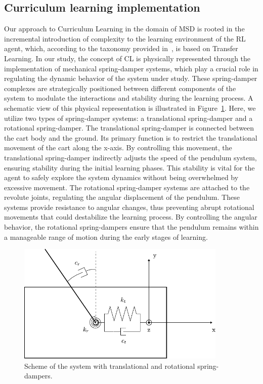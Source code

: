 \subsection{Curriculum learning implementation} \label{subsec: Curriculum learning implementation}
Our approach to Curriculum Learning in the domain of MSD is rooted in the incremental introduction of complexity to the learning environment of the RL agent, which, according to the taxonomy provided in~\cite{narvekar2020survey}, is based on Transfer Learning.
In our study, the concept of CL is physically represented through the implementation of mechanical spring-damper systems, which play a crucial role in regulating the dynamic behavior of the system under study. These spring-damper complexes are strategically positioned between different components of the system to modulate the interactions and stability during the learning process. A schematic view of this physical representation is illustrated in Figure~\ref{fig: cl mechanical implementation}. Here, we utilize two types of spring-damper systems: a translational spring-damper and a rotational spring-damper. The translational spring-damper is connected between the cart body and the ground. Its primary function is to restrict the translational movement of the cart along the x-axis. By controlling this movement, the translational spring-damper indirectly adjusts the speed of the pendulum system, ensuring stability during the initial learning phases. This stability is vital for the agent to safely explore the system dynamics without being overwhelmed by excessive movement. The rotational spring-damper systems are attached to the revolute joints, regulating the angular displacement of the pendulum. These systems provide resistance to angular changes, thus preventing abrupt rotational movements that could destabilize the learning process. By controlling the angular behavior, the rotational spring-dampers ensure that the pendulum remains within a manageable range of motion during the early stages of learning.

\begin{figure}[h]
	\centering
	\includegraphics[width=10cm]{Figures/cl_mech_implementation_v1.pdf}
	\caption{Scheme of the system with translational and rotational spring-dampers.}
	\label{fig: cl mechanical implementation}
\end{figure}

